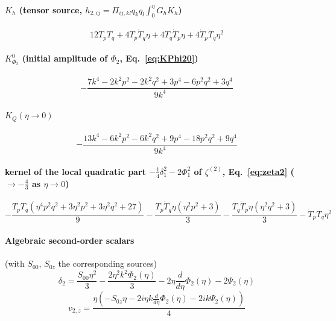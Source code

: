 \paragraph{$K_h$ (tensor source, $h_{2,ij}=\Pi_{ij,kl}q_kq_l\int_0^\eta G_hK_h$)}
\begin{dmath}
12 T_{p} T_{q} + 4 T_{p} \dot{T}_q \eta + 4 T_{q} \dot{T}_p \eta + 4 \dot{T}_p \dot{T}_q \eta^{2}
\end{dmath}

\paragraph{$K^0_{\Phi_2}$ (initial amplitude of $\Phi_2$, Eq.~\eqref{eq:KPhi20})}
\begin{dmath}
- \frac{7 k^{4} - 2 k^{2} p^{2} - 2 k^{2} q^{2} + 3 p^{4} - 6 p^{2} q^{2} + 3 q^{4}}{9 k^{4}}
\end{dmath}

\paragraph{$K_Q(\eta\to0)$}
\begin{dmath}
- \frac{13 k^{4} - 6 k^{2} p^{2} - 6 k^{2} q^{2} + 9 p^{4} - 18 p^{2} q^{2} + 9 q^{4}}{9 k^{4}}
\end{dmath}

\paragraph{kernel of the local quadratic part $-\tfrac14\delta_1^2-2\Phi_1^2$ of $\zeta^{(2)}$, Eq.~\eqref{eq:zeta2} ($\to-\tfrac43$ as $\eta\to0$)}
\begin{dmath}
- \frac{T_{p} T_{q} \left(\eta^{4} p^{2} q^{2} + 3 \eta^{2} p^{2} + 3 \eta^{2} q^{2} + 27\right)}{9} - \frac{T_{p} \dot{T}_q \eta \left(\eta^{2} p^{2} + 3\right)}{3} - \frac{T_{q} \dot{T}_p \eta \left(\eta^{2} q^{2} + 3\right)}{3} - \dot{T}_p \dot{T}_q \eta^{2}
\end{dmath}

\paragraph{Algebraic second-order scalars} (with $S_{00}$, $S_{0z}$ the corresponding sources)
\begin{dmath}
\delta_2 = \frac{S_{00} \eta^{2}}{3} - \frac{2 \eta^{2} k^{2} \Phi_{2}{\left(\eta \right)}}{3} - 2 \eta \frac{d}{d \eta} \Phi_{2}{\left(\eta \right)} - 2 \Psi_{2}{\left(\eta \right)}
\end{dmath}
\begin{dmath}
v_{2,z} = \frac{\eta \left(- S_{0z} \eta - 2 i \eta k \frac{d}{d \eta} \Phi_{2}{\left(\eta \right)} - 2 i k \Psi_{2}{\left(\eta \right)}\right)}{4}
\end{dmath}


